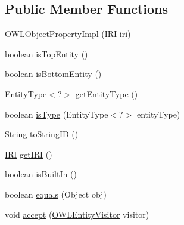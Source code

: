 \subsection*{Public Member Functions}
\begin{DoxyCompactItemize}
\item 
\hyperlink{classuk_1_1ac_1_1manchester_1_1cs_1_1owl_1_1owlapi_1_1_o_w_l_object_property_impl_a74c4c6960295687b94a67b0cb24430c3}{O\-W\-L\-Object\-Property\-Impl} (\hyperlink{classorg_1_1semanticweb_1_1owlapi_1_1model_1_1_i_r_i}{I\-R\-I} \hyperlink{classuk_1_1ac_1_1manchester_1_1cs_1_1owl_1_1owlapi_1_1_o_w_l_object_property_impl_a7f5856a83ead40b3b40e31c0210f194a}{iri})
\item 
boolean \hyperlink{classuk_1_1ac_1_1manchester_1_1cs_1_1owl_1_1owlapi_1_1_o_w_l_object_property_impl_a31e3b2024eda0c60bd6c772ea4d21fcf}{is\-Top\-Entity} ()
\item 
boolean \hyperlink{classuk_1_1ac_1_1manchester_1_1cs_1_1owl_1_1owlapi_1_1_o_w_l_object_property_impl_a8d5bcdec0c393ffedae72fb63e17a60e}{is\-Bottom\-Entity} ()
\item 
Entity\-Type$<$?$>$ \hyperlink{classuk_1_1ac_1_1manchester_1_1cs_1_1owl_1_1owlapi_1_1_o_w_l_object_property_impl_ad5829da5092cd360517e24e182bc1aaa}{get\-Entity\-Type} ()
\item 
boolean \hyperlink{classuk_1_1ac_1_1manchester_1_1cs_1_1owl_1_1owlapi_1_1_o_w_l_object_property_impl_afc544b0bd246435b463bace0ec3ae635}{is\-Type} (Entity\-Type$<$?$>$ entity\-Type)
\item 
String \hyperlink{classuk_1_1ac_1_1manchester_1_1cs_1_1owl_1_1owlapi_1_1_o_w_l_object_property_impl_aed8a0b9982709d52c382d5582be66291}{to\-String\-I\-D} ()
\item 
\hyperlink{classorg_1_1semanticweb_1_1owlapi_1_1model_1_1_i_r_i}{I\-R\-I} \hyperlink{classuk_1_1ac_1_1manchester_1_1cs_1_1owl_1_1owlapi_1_1_o_w_l_object_property_impl_a373f4ad02eebf7bedb9dbad2238f13b6}{get\-I\-R\-I} ()
\item 
boolean \hyperlink{classuk_1_1ac_1_1manchester_1_1cs_1_1owl_1_1owlapi_1_1_o_w_l_object_property_impl_a69a98687eee50323d5a7078147c8969d}{is\-Built\-In} ()
\item 
boolean \hyperlink{classuk_1_1ac_1_1manchester_1_1cs_1_1owl_1_1owlapi_1_1_o_w_l_object_property_impl_a02281c0a5db17a2a9652b3724abd981d}{equals} (Object obj)
\item 
void \hyperlink{classuk_1_1ac_1_1manchester_1_1cs_1_1owl_1_1owlapi_1_1_o_w_l_object_property_impl_a7469c63cb6c67e303efab39d585276af}{accept} (\hyperlink{interfaceorg_1_1semanticweb_1_1owlapi_1_1model_1_1_o_w_l_entity_visitor}{O\-W\-L\-Entity\-Visitor} visitor)

\end{DoxyCompactItemize}

